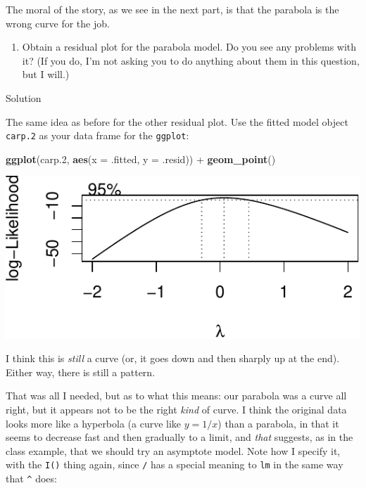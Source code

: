 \documentclass[]{tufte-book}
\newenvironment{Shaded}{}{}
\newcommand{\DataTypeTok}[1]{\textcolor[rgb]{0.56,0.13,0.00}{#1}}
\newcommand{\FloatTok}[1]{\textcolor[rgb]{0.25,0.63,0.44}{#1}}
\newcommand{\KeywordTok}[1]{\textcolor[rgb]{0.00,0.44,0.13}{\textbf{#1}}}
\newcommand{\NormalTok}[1]{#1}
\newcommand{\OperatorTok}[1]{\textcolor[rgb]{0.40,0.40,0.40}{#1}}
\newcommand{\StringTok}[1]{\textcolor[rgb]{0.25,0.44,0.63}{#1}}
\providecommand{\tightlist}{%
  \setlength{\itemsep}{0pt}\setlength{\parskip}{0pt}}
\theoremstyle{definition}
\theoremstyle{definition}
\theoremstyle{definition}
\theoremstyle{remark}
\begin{document}
The moral of the story, as we see in the next part, is that the parabola
is the wrong curve for the job.

\begin{enumerate}
\def\labelenumi{(\roman{enumi})}
\tightlist
\item
  Obtain a residual plot for the parabola model. Do you see any problems
  with it? (If you do, I'm not asking you to do anything about them in
  this question, but I will.)
\end{enumerate}

Solution

The same idea as before for the other residual plot. Use the fitted
model object \texttt{carp.2} as your data frame for the \texttt{ggplot}:

\begin{Shaded}
\begin{Highlighting}[]
\KeywordTok{ggplot}\NormalTok{(carp}\FloatTok{.2}\NormalTok{, }\KeywordTok{aes}\NormalTok{(}\DataTypeTok{x =}\NormalTok{ .fitted, }\DataTypeTok{y =}\NormalTok{ .resid)) }\OperatorTok{+}\StringTok{ }
\StringTok{    }\KeywordTok{geom_point}\NormalTok{()}
\end{Highlighting}
\end{Shaded}

\includegraphics{12-regression_files/figure-latex/unnamed-chunk-72-1}

I think this is \emph{still} a curve (or, it goes down and then sharply
up at the end). Either way, there is still a pattern.

That was all I needed, but as to what this means: our parabola was a
curve all right, but it appears not to be the right \emph{kind} of
curve. I think the original data looks more like a hyperbola (a curve
like \(y=1/x\)) than a parabola, in that it seems to decrease fast and
then gradually to a limit, and \emph{that} suggests, as in the class
example, that we should try an asymptote model. Note how I specify it,
with the \texttt{I()} thing again, since \texttt{/} has a special
meaning to \texttt{lm} in the same way that \texttt{\^{}} does:
\end{document}

